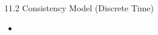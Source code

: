 \begin{frame}{11.2 Consistency Model (Discrete Time)}
    \begin{itemize}
        \item
    \end{itemize}
\end{frame}

